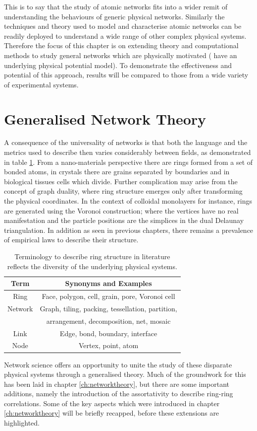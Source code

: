 This is to say that the study of atomic networks fits into a wider remit of understanding the behaviours of generic physical networks.
Similarly the techniques and theory used to model and characterise atomic networks can be readily deployed to understand a wide range of other complex physical systems.
Therefore the focus of this chapter is on extending theory and computational methods to study general \td{} networks which are physically motivated (\ie{} have an underlying physical potential model). 
To demonstrate the effectiveness and potential of this approach, results will be compared to those from a wide variety of experimental systems.

\section{Generalised Network Theory}

A consequence of the universality of \td{} networks is that both the language and the metrics used to describe then varies considerably between fields, as demonstrated in table \ref{tab:genterms}.
From a nano\--materials perspective there are rings formed from a set of bonded atoms, in crystals there are grains separated by boundaries and in biological tissues cells which divide.
Further complication may arise from the concept of graph duality, where ring structure emerges only after transforming the physical coordinates.
In the context of colloidal monolayers for instance, rings are generated using the Voronoi construction; where the vertices have no real manifestation and the particle positions are the simplices in the dual Delaunay triangulation.
In addition as seen in previous chapters, there remains a prevalence of empirical laws to describe their structure.

\begin{table}[bt]
	\centering
     \caption{Terminology to describe ring structure in literature reflects the diversity of the underlying physical systems.}
     \label{tab:genterms}
     \begin{tabular}{cc}
     \toprule
     Term & Synonyms and Examples \\
     \midrule
     Ring & Face, polygon, cell, grain, pore, Voronoi cell\\
     Network & Graph, tiling, packing, tessellation, partition, \\
     & arrangement, decomposition, net, mosaic\\
     Link & Edge, bond, boundary, interface \\
     Node & Vertex, point, atom \\
     \bottomrule
     \end{tabular}
\end{table}
Network science offers an opportunity to unite the study of these disparate physical systems through a generalised theory.
Much of the groundwork for this has been laid in chapter \ref{ch:networktheory}, but there are some important additions, namely the introduction of the assortativity to describe ring\--ring correlations.
Some of the key aspects which were introduced in chapter \ref{ch:networktheory} will be briefly recapped, before these extensions are highlighted.

